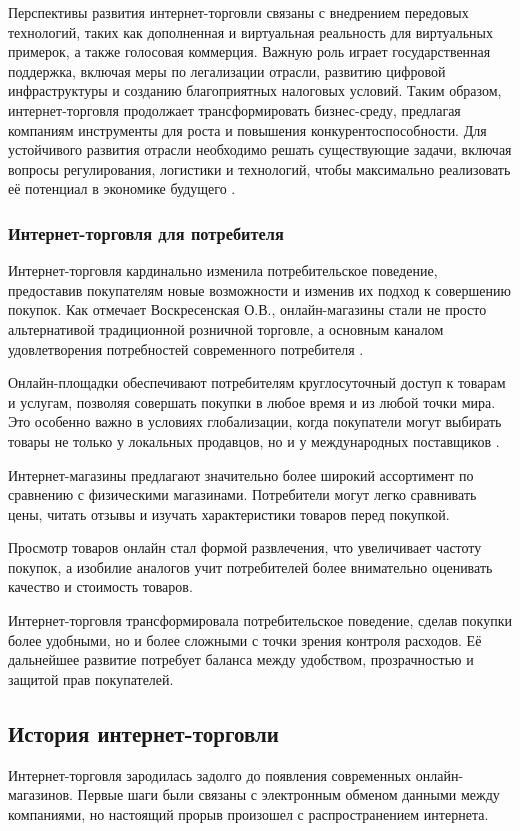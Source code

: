 Перспективы развития интернет-торговли связаны с внедрением передовых технологий, таких как дополненная и виртуальная реальность для виртуальных примерок, а также голосовая коммерция. Важную роль играет государственная поддержка, включая меры по легализации отрасли, развитию цифровой инфраструктуры и созданию благоприятных налоговых условий.
Таким образом, интернет-торговля продолжает трансформировать бизнес-среду, предлагая компаниям инструменты для роста и повышения конкурентоспособности. Для устойчивого развития отрасли необходимо решать существующие задачи, включая вопросы регулирования, логистики и технологий, чтобы максимально реализовать её потенциал в экономике будущего \cite{5}.



\subsubsection{Интернет-торговля для потребителя}

Интернет-торговля кардинально изменила потребительское поведение, предоставив покупателям новые возможности и изменив их подход к совершению покупок. Как отмечает Воскресенская О.В., онлайн-магазины стали не просто альтернативой традиционной розничной торговле, а основным каналом удовлетворения потребностей современного потребителя \cite{7}.

Онлайн-площадки обеспечивают потребителям круглосуточный доступ к товарам и услугам, позволяя совершать покупки в любое время и из любой точки мира. Это особенно важно в условиях глобализации, когда покупатели могут выбирать товары не только у локальных продавцов, но и у международных поставщиков \cite{8}.

Интернет-магазины предлагают значительно более широкий ассортимент по сравнению с физическими магазинами. Потребители могут легко сравнивать цены, читать отзывы и изучать характеристики товаров перед покупкой.

Просмотр товаров онлайн стал формой развлечения, что увеличивает частоту покупок, а изобилие аналогов учит потребителей более внимательно оценивать качество и стоимость товаров.

Интернет-торговля трансформировала потребительское поведение, сделав покупки более удобными, но и более сложными с точки зрения контроля расходов. Её дальнейшее развитие потребует баланса между удобством, прозрачностью и защитой прав покупателей.

\subsection {История интернет-торговли}
Интернет-торговля зародилась задолго до появления современных онлайн-магазинов. Первые шаги были связаны с электронным обменом данными между компаниями, но настоящий прорыв произошел с распространением интернета.

